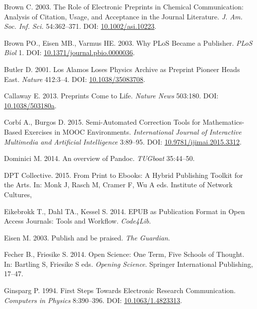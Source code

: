 \documentclass[10pt,fleqn]{wlpeerj}
\begin{document}
\hypertarget{ref-brownux5froleux5f2003}{}
Brown C. 2003. The Role of Electronic Preprints in Chemical
Communication: Analysis of Citation, Usage, and Acceptance in the
Journal Literature. \emph{J. Am. Soc. Inf. Sci.} 54:362--371. DOI:
\href{https://doi.org/10.1002/asi.10223}{10.1002/asi.10223}.

\hypertarget{ref-brownux5fwhyux5f2003}{}
Brown PO., Eisen MB., Varmus HE. 2003. Why PLoS Became a Publisher.
\emph{PLoS Biol} 1. DOI:
\href{https://doi.org/10.1371/journal.pbio.0000036}{10.1371/journal.pbio.0000036}.

\hypertarget{ref-butlerux5falamosux5f2001}{}
Butler D. 2001. Los Alamos Loses Physics Archive as Preprint Pioneer
Heads East. \emph{Nature} 412:3--4. DOI:
\href{https://doi.org/10.1038/35083708}{10.1038/35083708}.

\hypertarget{ref-callawayux5fpreprintsux5f2013}{}
Callaway E. 2013. Preprints Come to Life. \emph{Nature News} 503:180.
DOI: \href{https://doi.org/10.1038/503180a}{10.1038/503180a}.

\hypertarget{ref-garnetux5fsemiautomaticux5f2015}{}
Corbí A., Burgos D. 2015. Semi-Automated Correction Tools for
Mathematics-Based Exercises in MOOC Environments. \emph{International
Journal of Interactive Multimedia and Artificial Intelligence} 3:89--95.
DOI:
\href{https://doi.org/10.9781/ijimai.2015.3312}{10.9781/ijimai.2015.3312}.

\hypertarget{ref-dominiciux5fpandocux5f2014}{}
Dominici M. 2014. An overview of Pandoc. \emph{TUGboat} 35:44--50.

\hypertarget{ref-dptcollectiveux5ftoolkitux5f2015}{}
DPT Collective. 2015. From Print to Ebooks: A Hybrid Publishing Toolkit
for the Arts. In: Monk J, Rasch M, Cramer F, Wu A eds. Institute of
Network Cultures,

\hypertarget{ref-eikebrokkux5fepubux5f2014}{}
Eikebrokk T., Dahl TA., Kessel S. 2014. EPUB as Publication Format in
Open Access Journals: Tools and Workflow. \emph{Code4Lib}.

\hypertarget{ref-eisenux5fpublishux5f2003}{}
Eisen M. 2003. Publish and be praised. \emph{The Guardian}.

\hypertarget{ref-fecherux5fopenux5f2014}{}
Fecher B., Friesike S. 2014. Open Science: One Term, Five Schools of
Thought. In: Bartling S, Friesike S eds. \emph{Opening Science}.
Springer International Publishing, 17--47.

\hypertarget{ref-ginspargux5ffirstux5f1994}{}
Ginsparg P. 1994. First Steps Towards Electronic Research Communication.
\emph{Computers in Physics} 8:390--396. DOI:
\href{https://doi.org/10.1063/1.4823313}{10.1063/1.4823313}.
\end{document}
